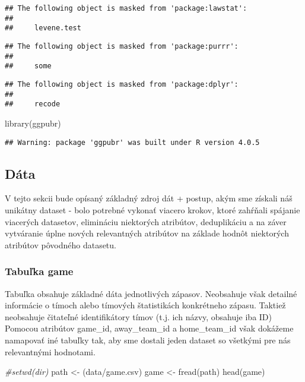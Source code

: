 \documentclass[
]{article}
\newenvironment{Shaded}{\begin{snugshade}}{\end{snugshade}}
\newcommand{\CommentTok}[1]{\textcolor[rgb]{0.56,0.35,0.01}{\textit{#1}}}
\newcommand{\FunctionTok}[1]{\textcolor[rgb]{0.00,0.00,0.00}{#1}}
\newcommand{\NormalTok}[1]{#1}
\newcommand{\OtherTok}[1]{\textcolor[rgb]{0.56,0.35,0.01}{#1}}
\newcommand{\StringTok}[1]{\textcolor[rgb]{0.31,0.60,0.02}{#1}}
\begin{document}
\begin{verbatim}
## The following object is masked from 'package:lawstat':
## 
##     levene.test
\end{verbatim}

\begin{verbatim}
## The following object is masked from 'package:purrr':
## 
##     some
\end{verbatim}

\begin{verbatim}
## The following object is masked from 'package:dplyr':
## 
##     recode
\end{verbatim}

\begin{Shaded}
\begin{Highlighting}[]
\FunctionTok{library}\NormalTok{(ggpubr)}
\end{Highlighting}
\end{Shaded}

\begin{verbatim}
## Warning: package 'ggpubr' was built under R version 4.0.5
\end{verbatim}

\hypertarget{duxe1ta}{%
\subsection{Dáta}\label{duxe1ta}}

V tejto sekcii bude opísaný základný zdroj dát + postup, akým sme
získali náš unikátny dataset - bolo potrebné vykonať viacero krokov,
ktoré zahŕňali spájanie viacerých datasetov, elimináciu niektorých
atribútov, deduplikáciu a na záver vytváranie úplne nových relevantných
atribútov na základe hodnôt niektorých atribútov pôvodného datasetu.

\hypertarget{tabuux13eka-game}{%
\subsubsection{Tabuľka game}\label{tabuux13eka-game}}

Tabuľka obsahuje základné dáta jednotlivých zápasov. Neobsahuje však
detailné informácie o tímoch alebo tímových štatistikách konkrétneho
zápasu. Taktiež neobsahuje čitateľné identifikátory tímov (t.j. ich
názvy, obsahuje iba ID) Pomocou atribútov game\_id, away\_team\_id a
home\_team\_id však dokážeme namapovať iné tabuľky tak, aby sme dostali
jeden dataset so všetkými pre nás relevantnými hodnotami.

\begin{Shaded}
\begin{Highlighting}[]
\CommentTok{\#setwd(dir) }
\NormalTok{path }\OtherTok{\textless{}{-}}\NormalTok{ (}\StringTok{\textquotesingle{}data/game.csv\textquotesingle{}}\NormalTok{)}
\NormalTok{game }\OtherTok{\textless{}{-}} \FunctionTok{fread}\NormalTok{(path)}
\FunctionTok{head}\NormalTok{(game)}
\end{Highlighting}
\end{Shaded}
\end{document}
